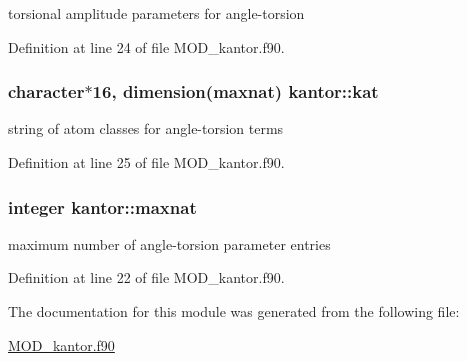 torsional amplitude parameters for angle-\/torsion 



Definition at line 24 of file M\-O\-D\-\_\-kantor.\-f90.

\hypertarget{classkantor_a0eae8ae2f7e4971be2bbc7522d9e7480}{
\subsubsection[{kat}]{\setlength{\rightskip}{0pt plus 5cm}character$\ast$16, dimension({\bf maxnat}) kantor\-::kat}}\label{classkantor_a0eae8ae2f7e4971be2bbc7522d9e7480}


string of atom classes for angle-\/torsion terms 



Definition at line 25 of file M\-O\-D\-\_\-kantor.\-f90.

\hypertarget{classkantor_a5d160591c7d1090e20d64ac57db387a6}{
\subsubsection[{maxnat}]{\setlength{\rightskip}{0pt plus 5cm}integer kantor\-::maxnat}}\label{classkantor_a5d160591c7d1090e20d64ac57db387a6}


maximum number of angle-\/torsion parameter entries 



Definition at line 22 of file M\-O\-D\-\_\-kantor.\-f90.



The documentation for this module was generated from the following file\-:\begin{DoxyCompactItemize}
\item 
\hyperlink{MOD__kantor_8f90}{M\-O\-D\-\_\-kantor.\-f90}\end{DoxyCompactItemize}

